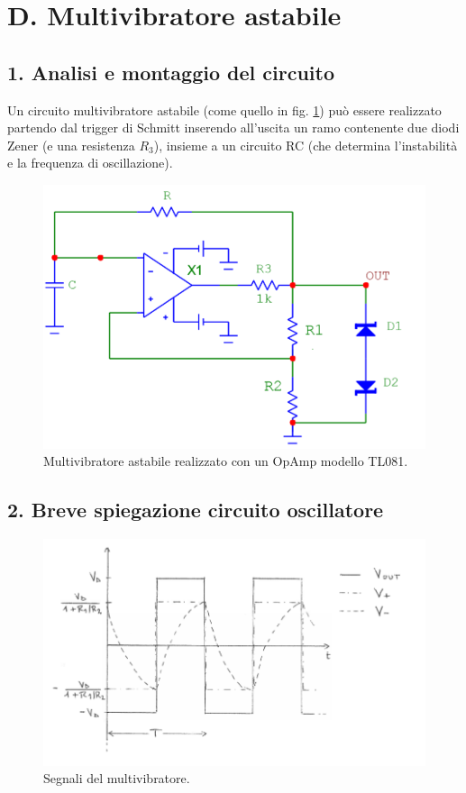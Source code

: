 \documentclass[10pt,a4paper]{article}
\begin{document}
\section*{D. Multivibratore astabile}
\subsection*{1. Analisi e montaggio del circuito}

Un circuito multivibratore astabile (come quello in fig. \ref{circuito4}) può essere realizzato partendo dal trigger di Schmitt inserendo all'uscita un ramo contenente due diodi Zener (e una resistenza $R_3$), insieme a un circuito RC (che determina l'instabilità e la frequenza di oscillazione).\\

\begin{figure}[htb!]
\centering
\includegraphics[scale=0.5]{multivibratoreAstabile.png}
\caption{Multivibratore astabile realizzato con un OpAmp modello TL081.\label{circuito4}}
\end{figure}

\subsection*{2. Breve spiegazione circuito oscillatore}

\begin{figure}[htb!]
\centering
\includegraphics[scale=.5]{funzionamentoOscillatore.png}
\caption{Segnali del multivibratore.}
\label{funzionamento}
\end{figure}
\end{document}
